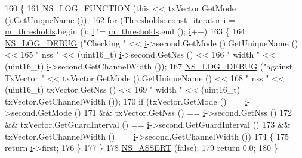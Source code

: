\begin{DoxyCode}
160 \{
161   \hyperlink{log-macros-disabled_8h_a90b90d5bad1f39cb1b64923ea94c0761}{NS\_LOG\_FUNCTION} (\textcolor{keyword}{this} << txVector.GetMode ().GetUniqueName ());
162   \textcolor{keywordflow}{for} (Thresholds::const\_iterator \hyperlink{bernuolliDistribution_8m_a6f6ccfcf58b31cb6412107d9d5281426}{i} = \hyperlink{classns3_1_1IdealWifiManager_add5cf767e7cc6a6d86da48d7be2ed2c9}{m\_thresholds}.begin (); \hyperlink{bernuolliDistribution_8m_a6f6ccfcf58b31cb6412107d9d5281426}{i} != 
      \hyperlink{classns3_1_1IdealWifiManager_add5cf767e7cc6a6d86da48d7be2ed2c9}{m\_thresholds}.end (); \hyperlink{bernuolliDistribution_8m_a6f6ccfcf58b31cb6412107d9d5281426}{i}++)
163     \{
164       \hyperlink{group__logging_ga413f1886406d49f59a6a0a89b77b4d0a}{NS\_LOG\_DEBUG} (\textcolor{stringliteral}{"Checking "} << \hyperlink{bernuolliDistribution_8m_a6f6ccfcf58b31cb6412107d9d5281426}{i}->second.GetMode ().GetUniqueName () <<
165                     \textcolor{stringliteral}{" nss "} << (uint16\_t) \hyperlink{bernuolliDistribution_8m_a6f6ccfcf58b31cb6412107d9d5281426}{i}->second.GetNss () <<
166                     \textcolor{stringliteral}{" width "} << (uint16\_t) \hyperlink{bernuolliDistribution_8m_a6f6ccfcf58b31cb6412107d9d5281426}{i}->second.GetChannelWidth ());
167       \hyperlink{group__logging_ga413f1886406d49f59a6a0a89b77b4d0a}{NS\_LOG\_DEBUG} (\textcolor{stringliteral}{"against TxVector "} << txVector.GetMode ().GetUniqueName () <<
168                     \textcolor{stringliteral}{" nss "} << (uint16\_t) txVector.GetNss () <<
169                     \textcolor{stringliteral}{" width "} << (uint16\_t) txVector.GetChannelWidth ());
170       \textcolor{keywordflow}{if} (txVector.GetMode () == \hyperlink{bernuolliDistribution_8m_a6f6ccfcf58b31cb6412107d9d5281426}{i}->second.GetMode ()
171           && txVector.GetNss () == \hyperlink{bernuolliDistribution_8m_a6f6ccfcf58b31cb6412107d9d5281426}{i}->second.GetNss ()
172           && txVector.GetGuardInterval () == \hyperlink{bernuolliDistribution_8m_a6f6ccfcf58b31cb6412107d9d5281426}{i}->second.GetGuardInterval ()
173           && txVector.GetChannelWidth () == \hyperlink{bernuolliDistribution_8m_a6f6ccfcf58b31cb6412107d9d5281426}{i}->second.GetChannelWidth ())
174         \{
175           \textcolor{keywordflow}{return} \hyperlink{bernuolliDistribution_8m_a6f6ccfcf58b31cb6412107d9d5281426}{i}->first;
176         \}
177     \}
178   \hyperlink{assert_8h_a6dccdb0de9b252f60088ce281c49d052}{NS\_ASSERT} (\textcolor{keyword}{false});
179   \textcolor{keywordflow}{return} 0.0;
180 \}
\end{DoxyCode}


